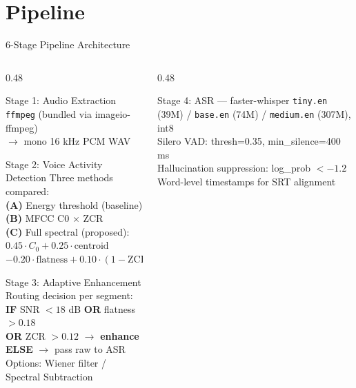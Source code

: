 \documentclass[aspectratio=169]{beamer}
\begin{document}
\section{Pipeline}
\begin{frame}{6-Stage Pipeline Architecture}
  \begin{columns}[T]
    \begin{column}{0.48\textwidth}
      \small
      \begin{block}{Stage 1: Audio Extraction}
        \texttt{ffmpeg} (bundled via imageio-ffmpeg)\\
        $\to$ mono 16 kHz PCM WAV
      \end{block}
      \begin{block}{Stage 2: Voice Activity Detection}
        Three methods compared:\\
        \textbf{(A)} Energy threshold (baseline)\\
        \textbf{(B)} MFCC C0 $\times$ ZCR\\
        \textbf{(C)} Full spectral (proposed):\\
        \quad $0.45\cdot C_0 + 0.25\cdot\text{centroid}$\\
        \quad $-0.20\cdot\text{flatness} + 0.10\cdot(1-\text{ZCR})$
      \end{block}
      \begin{block}{Stage 3: Adaptive Enhancement}
        Routing decision per segment:\\
        \textbf{IF} SNR $< 18$ dB \textbf{OR} flatness $> 0.18$\\
        \textbf{OR} ZCR $> 0.12$ $\to$ \textbf{enhance}\\
        \textbf{ELSE} $\to$ pass raw to ASR\\
        Options: Wiener filter / Spectral Subtraction
      \end{block}
    \end{column}
    \begin{column}{0.48\textwidth}
      \small
      \begin{block}{Stage 4: ASR — faster-whisper}
        \texttt{tiny.en} (39M) / \texttt{base.en} (74M) / \texttt{medium.en} (307M), int8\\
        Silero VAD: thresh=0.35, min\_silence=400 ms\\
        Hallucination suppression: log\_prob $< -1.2$\\
        Word-level timestamps for SRT alignment\\

\end{block}
\end{column}
\end{columns}
\end{frame}
\end{document}
